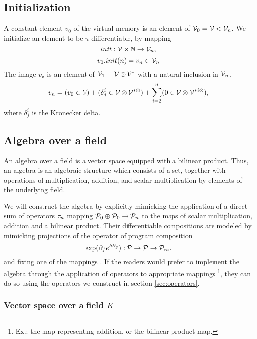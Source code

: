 \subsection{Initialization}

A constant element $v_0$ of the virtual memory is an element of $\mathcal{V}_0=\mathcal{V}<\mathcal{V}_n$. We initialize an element to be $n$-differentiable, by mapping
\begin{equation}
init:\mathcal{V}\times\mathbb{N}\to\mathcal{V}_n,
\end{equation}
\begin{equation}
v_0.init(n)=v_n\in\mathcal{V}_n
\end{equation}
The image $v_n$ is an element of $\mathcal{V}_1=\mathcal{V}\otimes\mathcal{V}^*$ with a natural inclusion in $\mathcal{V}_n$.
\begin{equation}
v_n=(v_0\in\mathcal{V})+(\delta^i_j\in\mathcal{V}\otimes\mathcal{V}^ {*\otimes})+\sum\limits_{i=2}^n(0\in\mathcal{V}\otimes\mathcal{V}^ {*i\otimes}),
\end{equation}
where $\delta^i_j$ is the Kronecker delta.

\subsection{Algebra over a field}\label{sec:Algebra}

 An algebra over a field is a vector space equipped with a bilinear product. Thus, an algebra is an algebraic structure which consists of a set, together with operations of multiplication, addition, and scalar multiplication by elements of the underlying field. \cite[p.~3]{Algebra}
 
We will construct the algebra by explicitly mimicking the application of a direct sum of operators $\tau_n$ mapping $\mathcal{P}_0\oplus\mathcal{P}_0\to\mathcal{P}_n$ to the maps of scalar multiplication, addition and a bilinear product. 
Their differentiable compositions are modeled by mimicking projections of the operator of program composition \cite[Theorem~5.3]{OperationalCalculus}
 \begin{equation}\label{eq:kom}
   \exp(\partial_fe^{h\partial_g}): \mathcal{P}\to \mathcal{P}\to\mathcal{P}_\infty.
   \end{equation}
and fixing one of the mappings \cite[eq.~44,~45]{OperationalCalculus}. If the readers would prefer to implement the algebra through the application of operators to appropriate mappings
\footnote{Ex.: the map representing addition, or the bilinear product map.},
they can do so using the operators we construct in section \ref{sec:operators}.

\subsubsection{Vector space over a field $K$}\label{sec:vectorSpace}
 
